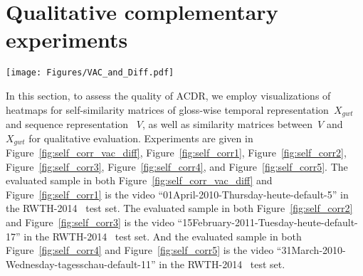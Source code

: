 \documentclass[sigconf]{acmart}
\begin{document}
\section{Qualitative complementary experiments}

\begin{figure*}
  \centering
  \texttt{[image: Figures/VAC\_and\_Diff.pdf]}
\caption{ The visualizations of heatmaps for self-similarity matrices of gloss-wise temporal representation $X_{gwt}$ and sequence representation $V$, as well as similarity matrices between $V$ and $X_{gwt}$~(the darker color represents the higher similarity). 
  VAC+ACDR$^{P^{tc}}$ refers to the VAC with its knowledge distillation loss (VA loss) replaced by ACDR optimization equipped with gloss-wise semantic condition $P^{tc}$.
  VAC+ACDR denotes the VAC enhanced by ACDR with both gloss-wise temporal semantic conditions and gloss semantic conditions.
 }
    
  \label{fig:self_corr_vac_diff}
\end{figure*}

In this section, to assess the quality of ACDR, we employ visualizations of heatmaps for self-similarity matrices of gloss-wise temporal representation~$X_{gwt}$ and sequence representation ~$V$, as well as similarity matrices between~$V$ and ~$X_{gwt}$ for qualitative evaluation.
Experiments are given in Figure~\ref{fig:self_corr_vac_diff}, Figure~\ref{fig:self_corr1}, Figure~\ref{fig:self_corr2}, Figure~\ref{fig:self_corr3}, Figure~\ref{fig:self_corr4}, and Figure~\ref{fig:self_corr5}.
The evaluated sample in both Figure~\ref{fig:self_corr_vac_diff} and  Figure~\ref{fig:self_corr1} is the video ``01April-2010-Thursday-heute-default-5'' in the RWTH-2014~\cite{koller2015continuous} test set.
The evaluated sample in both Figure~\ref{fig:self_corr2} and  Figure~\ref{fig:self_corr3} is the video ``15February-2011-Tuesday-heute-default-17'' in the RWTH-2014~\cite{koller2015continuous} test set.
And the evaluated sample in both Figure~\ref{fig:self_corr4} and  Figure~\ref{fig:self_corr5} is the video ``31March-2010-Wednesday-tagesschau-default-11'' in the RWTH-2014~\cite{koller2015continuous} test set.
\end{document}
